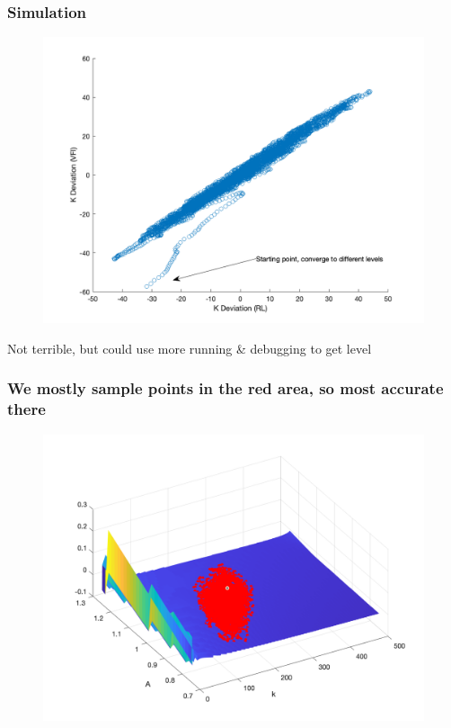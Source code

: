 \documentclass{beamer}
\begin{document}
\begin{frame}
\frametitle[alignment=center]{Simulation}
\begin{figure}
\centering
\includegraphics[scale=0.25]{Fig9.png}
\end{figure}
Not  terrible, but could use more running \& debugging to get level
\end{frame}




\begin{frame}
\frametitle[alignment=center]{We mostly sample points in the red area, so most accurate there}
\begin{figure}
\centering
\includegraphics[scale=0.25]{Fig4.png}
\end{figure}
\end{frame}
\end{document}

